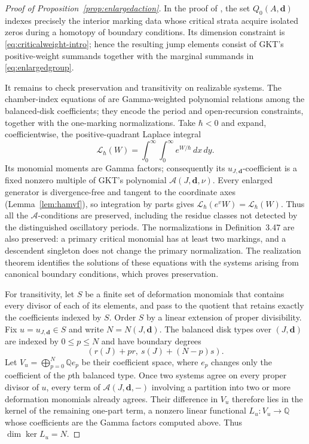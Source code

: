 \documentclass[11pt]{amsart}
\theoremstyle{definition}
\theoremstyle{remark}
\newcommand{\QQ}{\mathbb{Q}}
\begin{document}
\begin{proof}[Proof of Proposition~\ref{prop:enlargedaction}]
In the proof of \cite[Thm.~5.9]{GKT}, the set
$Q_0(A,\mathbf d)$ indexes precisely the interior marking data whose critical
strata acquire isolated zeros during a homotopy of boundary conditions.  Its
dimension constraint is \eqref{eq:criticalweight-intro}; hence the resulting
jump elements consist of GKT's positive-weight summands together with the
marginal summands in \eqref{eq:enlargedgroup}.

It remains to check preservation and transitivity on realizable systems.  The
chamber-index equations of \cite[Def.~3.47]{GKT} are Gamma-weighted polynomial
relations among the balanced-disk coefficients; they encode the period and
open-recursion constraints, together with the one-marking normalizations.
Take $\hbar<0$ and expand, coefficientwise, the positive-quadrant Laplace
integral
\[
 \mathcal L_\hbar(W)=\int_0^\infty\!\int_0^\infty e^{W/\hbar}\,dx\,dy.
\]
Its monomial moments are Gamma factors; consequently its
$u_{J,\mathbf d}$-coefficient is a fixed nonzero multiple of GKT's polynomial
$\mathcal A(J,\mathbf d,\nu)$.  Every enlarged generator is divergence-free
and tangent to the coordinate axes (Lemma~\ref{lem:hamvf}), so integration by parts gives
$\mathcal L_\hbar(e^vW)=\mathcal L_\hbar(W)$.  Thus all the
$\mathcal A$-conditions are preserved, including the residue classes not
detected by the distinguished oscillatory periods.  The normalizations in
Definition~3.47 are also preserved: a primary critical monomial has at least
two markings, and a descendent singleton does not change the primary
normalization.  The realization theorem
\cite[Thm.~5.13 and Cor.~5.14]{GKT} identifies the solutions of these equations
with the systems arising from canonical boundary conditions, which proves
preservation.

For transitivity, let $S$ be a finite set of deformation monomials that contains
every divisor of each of its elements, and pass to the quotient that retains
exactly the coefficients indexed by $S$.  Order $S$ by a linear extension of
proper divisibility.  Fix $u=u_{J,\mathbf d}\in S$ and write
$N=N(J,\mathbf d)$.  The balanced disk types over $(J,\mathbf d)$ are indexed
by $0\le p\le N$ and have boundary degrees
\[
 (r(J)+pr,\ s(J)+(N-p)s).
\]
Let $V_u=\bigoplus_{p=0}^{N}\QQ e_p$ be their coefficient space, where $e_p$
changes only the coefficient of the $p$th balanced type.  Once two systems
agree on every proper divisor of $u$, every term of
$\mathcal A(J,\mathbf d,-)$ involving a partition into two or more deformation
monomials already agrees.  Their difference in $V_u$ therefore lies in the
kernel of the remaining one-part term, a nonzero linear functional
$L_u:V_u\to\QQ$ whose coefficients are the Gamma factors computed above.
Thus $\dim\ker L_u=N$.


\end{proof}
\end{document}
